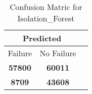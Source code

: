 \begin{table}[] 
\caption{Confusion Matric for Isolation_Forest} 
\label{Table: Prediction Accuracy-NoneIsolation_ForestOnlySunEKF-ignoreReflection-Reflection} 
\centering 
\begin{tabular} 
 {@{}ccc@{}} 
\toprule 
\multicolumn{2}{c}{\textbf{Predicted}}
 \\ \midrule 
\multicolumn{1}{|c|}{Failure} & 
\multicolumn{1}{c|}{No Failure}
 \\ \midrule 
\multicolumn{1}{|c|}{\color{green}\textbf{57800}} & 
\multicolumn{1}{c|}{\color{green}\textbf{60011}}
 \\ \midrule 
\multicolumn{1}{|c|}{\color{red}\textbf{8709}} & 
\multicolumn{1}{c|}{\color{red}\textbf{43608}}
 \\ \bottomrule 
\end{tabular} 
\end{table} 
